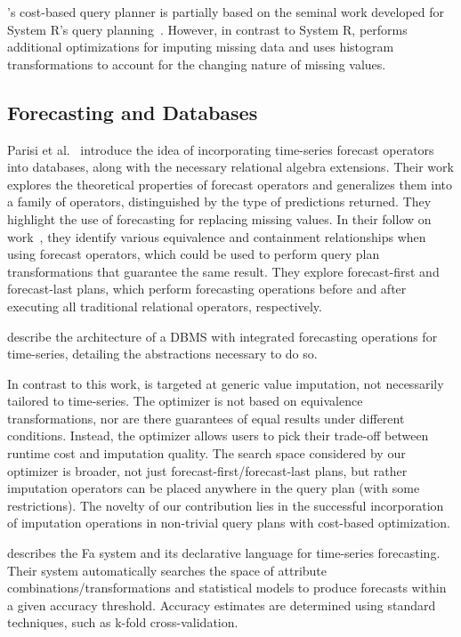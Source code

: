 \ProjectName's cost-based query planner 
is partially based on the seminal work developed for System R's query planning~\cite{blasgen1981system}.
However, in contrast to System R, \ProjectName{} performs additional optimizations for imputing missing data and
uses histogram transformations to account for the changing nature of missing values.

\subsection{Forecasting and Databases}
Parisi et al.~\cite{parisi2011embedding} introduce the idea of incorporating time-series forecast operators into
databases, along with the necessary relational algebra extensions. Their work explores the theoretical
properties of forecast operators and generalizes them into a family of operators, distinguished by
the type of predictions returned. They highlight the use of forecasting for replacing missing values.
In their follow on work~\cite{parisi2013temporal}, they identify various equivalence and containment
relationships when using forecast operators, which could be used to perform query plan transformations that guarantee the same result. They
explore forecast-first and forecast-last plans, which perform forecasting operations before and after executing all traditional
relational operators, respectively. 

\cite{fischer2013towards} describe the architecture of a DBMS with integrated forecasting operations for time-series, detailing
the abstractions necessary to do so.

In contrast to this work, \ProjectName{} is targeted at generic value imputation, not necessarily tailored to 
time-series. The optimizer is not based on equivalence transformations, nor are there guarantees of equal
results under different conditions. Instead, the optimizer allows users to pick their trade-off between
runtime cost and imputation quality. The search space considered by our optimizer is broader, not just
forecast-first/forecast-last plans, but rather imputation operators can be placed anywhere in the query plan
(with some restrictions). The novelty of our contribution lies in the successful incorporation of
imputation operations in non-trivial query plans with cost-based optimization.

\cite{duan2007processing} describes the Fa system and its declarative language for time-series forecasting. Their
system automatically searches the space of attribute combinations/transformations and statistical models
to produce forecasts within a given accuracy threshold. Accuracy estimates are determined using
standard techniques, such as k-fold cross-validation. 

